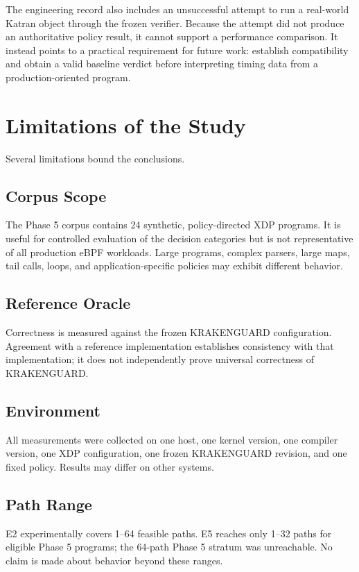 \documentclass[12pt,a4paper]{article}
\begin{document}
The engineering record also includes an unsuccessful attempt to run a real-world Katran object through the frozen verifier. Because the attempt did not produce an authoritative policy result, it cannot support a performance comparison. It instead points to a practical requirement for future work: establish compatibility and obtain a valid baseline verdict before interpreting timing data from a production-oriented program.

\section{Limitations of the Study}

Several limitations bound the conclusions.

\subsection{Corpus Scope}
The Phase 5 corpus contains 24 synthetic, policy-directed XDP programs. It is useful for controlled evaluation of the decision categories but is not representative of all production eBPF workloads. Large programs, complex parsers, large maps, tail calls, loops, and application-specific policies may exhibit different behavior.

\subsection{Reference Oracle}
Correctness is measured against the frozen KRAKENGUARD configuration. Agreement with a reference implementation establishes consistency with that implementation; it does not independently prove universal correctness of KRAKENGUARD.

\subsection{Environment}
All measurements were collected on one host, one kernel version, one compiler version, one XDP configuration, one frozen KRAKENGUARD revision, and one fixed policy. Results may differ on other systems.

\subsection{Path Range}
E2 experimentally covers 1--64 feasible paths. E5 reaches only 1--32 paths for eligible Phase 5 programs; the 64-path Phase 5 stratum was unreachable. No claim is made about behavior beyond these ranges.
\end{document}
